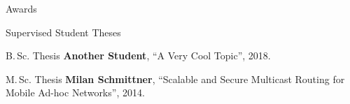 \begin{cv}{}
\begin{cvlist}{{Awards}}
\end{cvlist}        


\begin{cvlist}{{Supervised Student Theses}}

\item[B.\,Sc. Thesis] \textbf{Another Student}, \enquote{A Very Cool Topic}, 2018.

\item[M.\,Sc. Thesis] \textbf{Milan Schmittner}, \enquote{Scalable and Secure Multicast Routing for Mobile Ad-hoc Networks}, 2014.

\end{cvlist}



\date{\myLocation{}, \myTime{}}

\end{cv}
